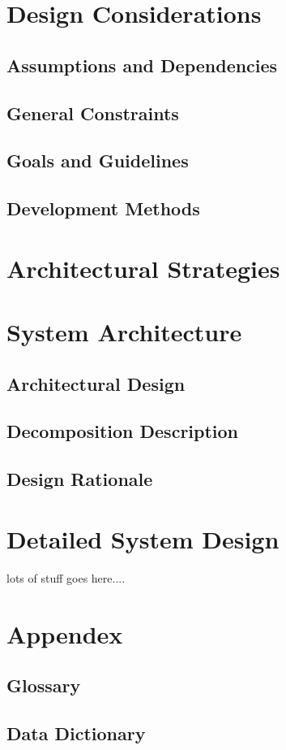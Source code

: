 \documentclass[12pt, letterpaper]{article}
\begin{document}
\section{Design Considerations}
  \subsection{Assumptions and Dependencies}
  \subsection{General Constraints}
  \subsection{Goals and Guidelines}
  \subsection{Development Methods}

\section{Architectural Strategies}
\section{System Architecture}
  \subsection{Architectural Design}
  \subsection{Decomposition Description}
  \subsection{Design Rationale}

\section{Detailed System Design}
  lots of stuff goes here....

\section{Appendex}
  \subsection{Glossary}
  \subsection{Data Dictionary}



{}

\end{document}
